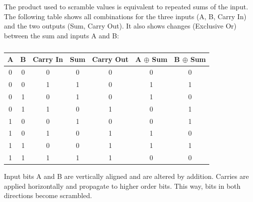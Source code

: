 \documentclass[letterpaper]{article}
\begin{document}
\begin{multicols}{2}
    The product used to scramble values is equivalent to repeated sums of the input. The following table shows all combinations for the three inputs (A, B, Carry In) and the two outputs (Sum, Carry Out). It also shows changes (Exclusive Or) between the sum and inputs A and B:

    \begin{table}[ht]
        \centering
        \begin{tabular}{|c c c|c c|c c|}
            \hline
            \textbf{A} & \textbf{B} & \textbf{Carry In} & \textbf{Sum} & \textbf{Carry Out} & \textbf{A $\oplus$ Sum} & \textbf{B $\oplus$ Sum} \\
            \hline
            0          & 0          & 0                 & 0            & 0                  & 0                       & 0                       \\
            0          & 0          & 1                 & 1            & 0                  & 1                       & 1                       \\
            0          & 1          & 0                 & 1            & 0                  & 1                       & 0                       \\
            0          & 1          & 1                 & 0            & 1                  & 0                       & 1                       \\
            1          & 0          & 0                 & 1            & 0                  & 0                       & 1                       \\
            1          & 0          & 1                 & 0            & 1                  & 1                       & 0                       \\
            1          & 1          & 0                 & 0            & 1                  & 1                       & 1                       \\
            1          & 1          & 1                 & 1            & 1                  & 0                       & 0                       \\
            \hline
        \end{tabular}
        \caption{}
    \end{table}

    Input bits A and B are vertically aligned and are altered by addition. Carries are applied horizontally and propagate to higher order bits. This way, bits in both directions become scrambled.


\end{multicols}
\end{document}
